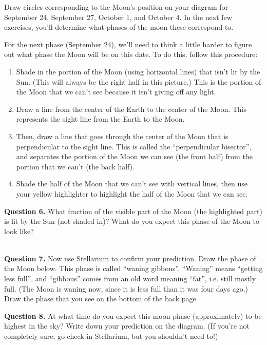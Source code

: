 \documentclass[11pt]{article}
\begin{document}
Draw circles corresponding to the Moon's position on your diagram for September 24, September 27, October 1, and October 4. In the next few exercises, you'll determine what phases of the moon these correspond to.

\newpage

For the next phase (September 24), we'll need to think a little harder to figure out what phase the Moon will be on this date. 
To do this, follow this procedure:

\begin{enumerate}
	\item Shade in the portion of the Moon (using horizontal lines) that isn't lit by the Sun. (This will always be the right half in this picture.) This is the portion of the Moon that we can't see because it isn't giving off any light.
	\item Draw a line from the center of the Earth to the center of the Moon. This represents the sight line from the Earth to the Moon.
	\item Then, draw a line that goes through the center of the Moon that is perpendicular to the sight line. This is called the ``perpendicular bisector'', and separates the portion of the Moon we can see (the front half) from the portion that we can't (the back half).
	\item Shade the half of the Moon that we can't see with vertical lines, then use your yellow highlighter to highlight the half of the Moon that we can see.
\end{enumerate}

\textbf{Question 6.} What fraction of the visible part of the Moon (the highlighted part) is lit by the Sun (not shaded in)? What do you expect this phase of the Moon to look like?


\vspace*{1.5cm}

\hrulefill\\

\textbf{Question 7.} Now use Stellarium to confirm your prediction. Draw the phase of the Moon below. This phase is called ``waning gibbous''. ``Waning'' means ``getting less full'', and ``gibbous'' comes from an old word meaning ``fat'', i.e. still mostly full. (The Moon is waning now, since it is less full than it was four days ago.)
Draw the phase that you see on the bottom of the back page.


\textbf{Question 8.} At what time do you expect this moon phase (approximately) to be highest in the sky? Write down your prediction on the diagram. (If you're not completely sure, go check in Stellarium, but you shouldn't need to!)
\end{document}
